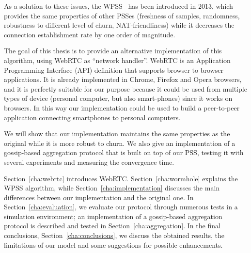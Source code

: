 As a solution to these issues, the \ac{WPSS}~\cite{wormhole} has been introduced in 2013, which provides the same properties of other PSSes (freshness of samples, randomness, robustness to different level of churn, NAT-friendliness) while it decreases the connection establishment rate by one order of magnitude. 

The goal of this thesis is to provide an alternative implementation of this algorithm, using WebRTC as ``network handler''. WebRTC is an Application Programming Interface (API) definition that supports browser-to-browser applications. It is already implemented in Chrome, Firefox and Opera browsers, and it is perfectly suitable for our purpose because it could be used from multiple types of device (personal computer, but also smart-phones) since it works on browsers. In this way our implementation could be used to build a peer-to-peer application connecting smartphones to  personal computers.

We will show that our implementation maintains the same properties as the original while it is more robust to churn. We also give an implementation of a gossip-based aggregation protocol that is built on top of our PSS, testing it with several experiments and measuring the convergence time.

Section~\ref{cha:webrtc} introduces WebRTC. Section~\ref{cha:wormhole} explains the \ac{WPSS} algorithm, while Section~\ref{cha:implementation} discusses the main differences between our implementation and the original one. In Section~\ref{cha:evaluation}, we evaluate our protocol through numerous tests in a simulation environment; an implementation of a gossip-based aggregation protocol is described and tested in Section~\ref{cha:aggregation}. In the final conclusions, Section~\ref{cha:conclusions}, we discuss the obtained results, the limitations of our model and some suggestions for possible enhancements.
